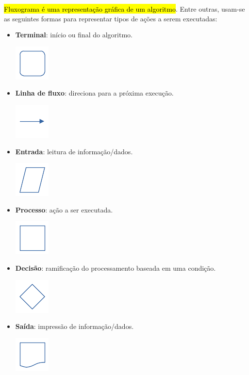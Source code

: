 \hl{Fluxograma é uma representação gráfica de um algoritmo}. Entre outras, usam-se as seguintes formas para representar tipos de ações a serem executadas:
\begin{itemize}
\item {\bf Terminal}: início ou final do algoritmo.
  \begin{center}
    \includegraphics{./cap_lingua/dados/fig_fluxograma/terminal}
  \end{center}  
\item {\bf Linha de fluxo}: direciona para a próxima execução.
  \begin{center}
    \includegraphics{./cap_lingua/dados/fig_fluxograma/linha}
  \end{center}
\item {\bf Entrada}: leitura de informação/dados.
  \begin{center}
    \includegraphics{./cap_lingua/dados/fig_fluxograma/entrada}
  \end{center}  
\item {\bf Processo}: ação a ser executada.
  \begin{center}
    \includegraphics{./cap_lingua/dados/fig_fluxograma/processo}
  \end{center}
\item {\bf Decisão}: ramificação do processamento baseada em uma condição.
  \begin{center}
    \includegraphics{./cap_lingua/dados/fig_fluxograma/decisao}
  \end{center}
\item {\bf Saída}: impressão de informação/dados.
  \begin{center}
    \includegraphics{./cap_lingua/dados/fig_fluxograma/saida}
\end{center}
\end{itemize}

